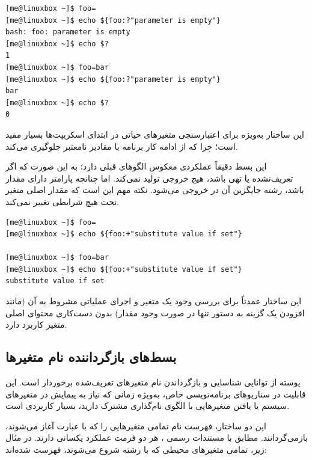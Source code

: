 \begin{latin}
\begin{lstlisting}
[me@linuxbox ~]$ foo=
[me@linuxbox ~]$ echo ${foo:?"parameter is empty"}
bash: foo: parameter is empty
[me@linuxbox ~]$ echo $?
1
[me@linuxbox ~]$ foo=bar
[me@linuxbox ~]$ echo ${foo:?"parameter is empty"}
bar
[me@linuxbox ~]$ echo $?
0
\end{lstlisting}
\end{latin}

این ساختار به‌ویژه برای اعتبارسنجی متغیرهای حیاتی در ابتدای اسکریپت‌ها بسیار مفید است؛ چرا که از ادامه کار برنامه با مقادیر نامعتبر جلوگیری می‌کند.

\textbf{}

این بسط دقیقاً عملکردی معکوس الگوهای قبلی دارد؛ به این صورت که اگر  تعریف‌نشده یا تهی باشد، هیچ خروجی تولید نمی‌کند. اما چنانچه پارامتر دارای مقدار باشد، رشته  جایگزین آن در خروجی می‌شود. نکته مهم این است که مقدار اصلی متغیر تحت هیچ شرایطی تغییر نمی‌کند.

\begin{latin}
\begin{lstlisting}
[me@linuxbox ~]$ foo=
[me@linuxbox ~]$ echo ${foo:+"substitute value if set"}

[me@linuxbox ~]$ foo=bar
[me@linuxbox ~]$ echo ${foo:+"substitute value if set"}
substitute value if set
\end{lstlisting}
\end{latin}

این ساختار عمدتاً برای بررسی وجود یک متغیر و اجرای عملیاتی مشروط به آن (مانند افزودن یک گزینه به دستور تنها در صورت وجود مقدار) بدون دست‌کاری محتوای اصلی متغیر کاربرد دارد.

\subsection{بسط‌های بازگرداننده نام متغیرها}

پوسته  از توانایی شناسایی و بازگرداندن نام متغیرهای تعریف‌شده برخوردار است. این قابلیت در سناریوهای برنامه‌نویسی خاص، به‌ویژه زمانی که نیاز به پیمایش در متغیرهای سیستم یا یافتن متغیرهایی با الگوی نام‌گذاری مشترک دارید، بسیار کاربردی است.

\textbf{}
\textbf{}

این دو ساختار، فهرست نام تمامی متغیرهایی را که با عبارت  آغاز می‌شوند، بازمی‌گردانند. مطابق با مستندات رسمی ، هر دو فرمت عملکرد یکسانی دارند. در مثال زیر، تمامی متغیرهای محیطی که با رشته  شروع می‌شوند، فهرست شده‌اند:

